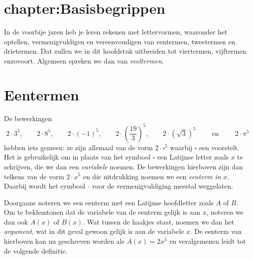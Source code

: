 \documentclass{ximera}
\begin{document}
\blancobijrectoverso

\renewcommand{\contentsname}{\huge{Inhoud}} 

\blancobijrectoverso

\setcounter{totaalaantalvoorbladen}{\value{page}}



\section{chapter:Basisbegrippen}

In de voorbije jaren heb je leren rekenen met lettervormen, waaronder het optellen, ver\-menigvuldigen en vereenvoudigen van eentermen, tweetermen en drietermen. Dat zullen we in dit hoofdstuk uitbreiden tot viertermen, vijftermen enzovoort. Algemeen spreken we dan van {\em veeltermen}.

\section{Eentermen}

De bewerkingen
\[
2\cdot 3^5, \qquad 2\cdot 8^5, \qquad 2\cdot (-1)^5, \qquad 2\cdot\left(\frac{19}{3}\right)^5, \qquad 2\cdot\left(\sqrt{3}\right)^5 \qquad \text{ en } \qquad 2 \cdot \pi^5
\]
hebben iets gemeen: ze zijn allemaal van de vorm $2\cdot \square^5$ waarbij $\square$ een  voorstelt. Het is gebruikelijk om in plaats van het symbool $\square$ een Latijnse letter zoals $x$ te schrijven, die we dan een {\em variabele} noemen. De bewerkingen hierboven zijn dan telkens van de vorm $2 \cdot x^5$ en die uitdrukking noemen we een {\em eenterm in $x$}. Daarbij wordt het symbool $\cdot$ voor de vermenigvuldiging meestal weggelaten. 

Doorgaans noteren we een eenterm met een Latijnse hoofdletter zoals $A$ of $B$. Om te beklemtonen dat de variabele van de eenterm gelijk is aan $x$, noteren we dan ook $A(x)$ of $B(x)$. Wat tussen de haakjes staat, noemen we dan het {\em argument}, wat in dit geval gewoon gelijk is aan de variabele $x$. De eenterm van hierboven kan nu geschreven worden als $A(x) = 2x^5$ en veralgemenen leidt tot de volgende definitie.
\end{document}
